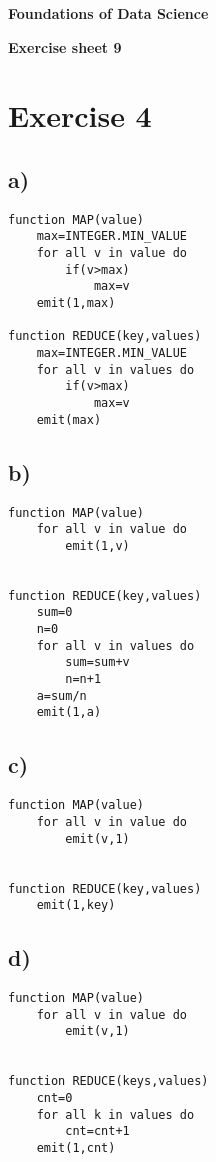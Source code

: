 \documentclass[a4paper,10pt]{article}
\begin{document}
\centerline{\Large\bfseries  Foundations of Data Science }
\centerline{\bfseries  Exercise sheet 9}

\section*{Exercise 4}
\subsection*{a)}
\begin{lstlisting}
function MAP(value)
	max=INTEGER.MIN_VALUE
	for all v in value do
		if(v>max)
			max=v
	emit(1,max)
	
function REDUCE(key,values)
	max=INTEGER.MIN_VALUE
	for all v in values do
		if(v>max)
			max=v
	emit(max)
\end{lstlisting}
\subsection*{b)}
\begin{lstlisting}
function MAP(value)
	for all v in value do
		emit(1,v)

	
function REDUCE(key,values)
	sum=0
	n=0
	for all v in values do
		sum=sum+v
		n=n+1
	a=sum/n
	emit(1,a)
\end{lstlisting}

\subsection*{c)}
\begin{lstlisting}
function MAP(value)
	for all v in value do
		emit(v,1)

	
function REDUCE(key,values)
	emit(1,key)
\end{lstlisting}

\subsection*{d)}
\begin{lstlisting}
function MAP(value)
	for all v in value do
		emit(v,1)

	
function REDUCE(keys,values)
	cnt=0
	for all k in values do
		cnt=cnt+1
	emit(1,cnt)
		
\end{lstlisting}
\end{document}
